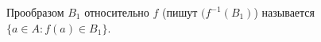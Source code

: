 
    Прообразом $B_1$ относительно $f$ (пишут $(f^{-1}(B_1)$) называется $\big\{a\in A\colon f(a)\in B_1\big\}$.
